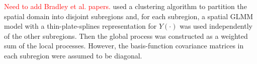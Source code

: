\documentclass[article]{jss}
\newcommand{\red}[1]{\textcolor{red}{#1}}
\begin{document}
\red{Need to add Bradley et al. papers.} 
\cite{Lee_2020_partitioned_domain_basis_function_non_Gaussian} used a clustering algorithm to partition the spatial domain into disjoint subregions and, for each subregion, a spatial GLMM model with a thin-plate-splines representation for $Y(\cdot)$ was used independently of the other subregions. 
 Then the global process was constructed as a weighted sum of the local processes. However, the basis-function covariance matrices in each subregion were assumed to be diagonal. 
\end{document}
